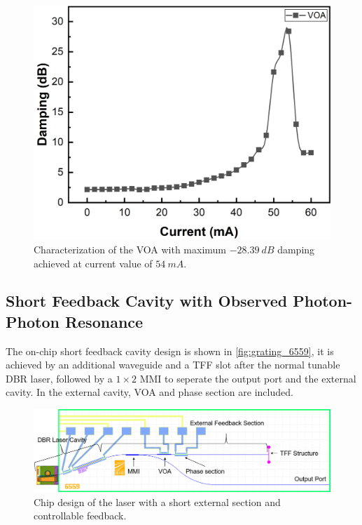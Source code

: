 
\begin{figure}[H]
    \centering
    \includegraphics[width=0.6\linewidth]{figures/VOA_18321.png}
    \caption{Characterization of the VOA with maximum $-28.39 \ dB$ damping achieved at current value of $54 \ mA$.}
    \label{fig:VOA_18321}
\end{figure}

\subsection{Short Feedback Cavity with Observed Photon-Photon Resonance} \label{subsec:short_feedback_cavity}
The on-chip short feedback cavity design is shown in \autoref{fig:grating_6559}, it is achieved by an additional waveguide and a TFF slot after the normal tunable DBR laser, followed by a $1\times 2$ MMI to seperate the output port and the external cavity. In the external cavity, VOA and phase section are included.  

\begin{figure}[H]
    \centering
    \includegraphics[width=\linewidth]{figures/6559_short_comment.png}
    \caption{Chip design of the laser with a short external section and controllable feedback.}
    \label{fig:grating_6559}
\end{figure}


